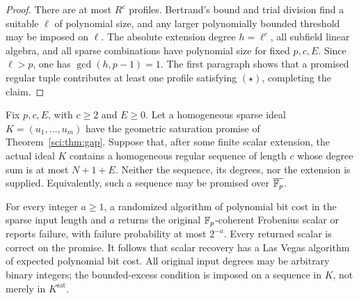 \begin{proof}
There are at most \(R^c\) profiles. Bertrand's bound and trial
division find a suitable \(\ell\) of polynomial size, and any larger
polynomially bounded threshold may be imposed on \(\ell\).
The absolute extension degree \(h=\ell^c\), all subfield linear
algebra, and all sparse combinations have polynomial size for fixed
\(p,c,E\). Since \(\ell>p\), one has \(\gcd(h,p-1)=1\).
The first paragraph shows that a promised regular tuple contributes
at least one profile satisfying \((\star)\), completing the claim.
\end{proof}

\begin{theorem}
\label{sci:thm:random-excess}
Fix \(p,c,E\), with \(c\geq2\) and \(E\geq0\). Let a homogeneous
sparse ideal \(K=(u_1,\ldots,u_m)\) have the geometric saturation
promise of Theorem~\ref{sci:thm:gap}. Suppose that, after some finite
scalar extension, the actual ideal \(K\) contains a homogeneous
regular sequence of length \(c\) whose degree sum is at most
\(N+1+E\). Neither the sequence, its degrees, nor the extension is
supplied. Equivalently, such a sequence may be promised over
\(\overline{\mathbb F_p}\).

For every integer \(a\geq1\), a randomized algorithm of polynomial bit cost
in the sparse input length and \(a\) returns the original
\(\mathbb F_p\)-coherent Frobenius scalar or reports failure, with failure
probability at most \(2^{-a}\). Every returned scalar is correct on
the promise. It follows that scalar recovery has a Las Vegas algorithm
of expected polynomial bit cost. All original input degrees may be
arbitrary binary integers; the bounded-excess condition is imposed on
a sequence in \(K\), not merely in \(K^{\mathrm{sat}}\).
\end{theorem}
